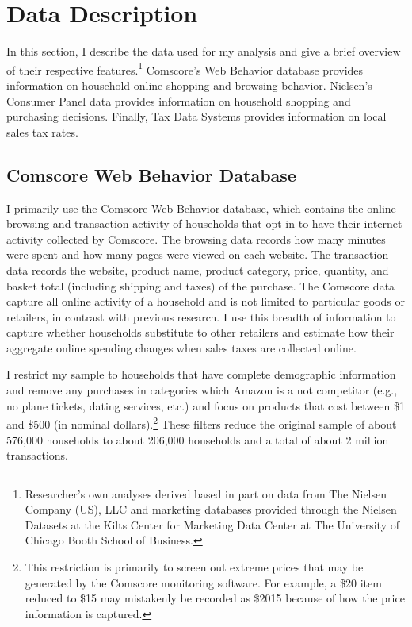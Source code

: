 \documentclass[AEJ,reviewmode]{AEA}
\begin{document}
\section{Data Description}
\label{sec:data}

In this section, I describe the data used for my analysis and give a brief overview of their respective features.\footnote{Researcher's own analyses derived based in part on data from The Nielsen Company (US), LLC and marketing databases provided through the Nielsen Datasets at the Kilts Center for Marketing Data Center at The University of Chicago Booth School of Business.} Comscore's Web Behavior database provides information on household online shopping and browsing behavior. Nielsen's Consumer Panel data provides information on household shopping and purchasing decisions. Finally, Tax Data Systems provides information on local sales tax rates.

\subsection{Comscore Web Behavior Database}
I primarily use the Comscore Web Behavior database, which contains the online browsing and transaction activity of households that opt-in to have their internet activity collected by Comscore. The browsing data records how many minutes were spent and how many pages were viewed on each website. The transaction data records the website, product name, product category, price, quantity, and basket total (including shipping and taxes) of the purchase. The Comscore data capture all online activity of a household and is not limited to particular goods or retailers, in contrast with previous research. I use this breadth of information to capture whether households substitute to other retailers and estimate how their aggregate online spending changes when sales taxes are collected online.

I restrict my sample to households that have complete demographic information and remove any purchases in categories which Amazon is a not competitor (e.g., no plane tickets, dating services, etc.) and focus on products that cost between \$1 and \$500 (in nominal dollars).\footnote{This restriction is primarily to screen out extreme prices that may be generated by the Comscore monitoring software. For example, a \$20 item reduced to \$15 may mistakenly be recorded as \$2015 because of how the price information is captured.} These filters reduce the original sample of about 576,000 households to about 206,000 households and a total of about 2 million transactions.
\end{document}
